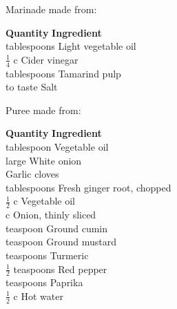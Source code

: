 Marinade made from:
\begin{tabbing}
\hspace{1.0cm}  \={\bf Quantity}   \hspace{3.0cm} \={\bf Ingredient}\\

        tablespoons \>Light vegetable oil\\
        \> $\frac{1}{4}$ c \>Cider vinegar\\
         tablespoons \>Tamarind pulp\\
        \> to taste      \> Salt\\
\end{tabbing}

Puree made from:
\begin{tabbing}
\hspace{1.0cm}  \={\bf Quantity}   \hspace{3.0cm} \={\bf Ingredient}\\

         tablespoon \>Vegetable oil\\
         large \>White onion\\
         \>Garlic cloves\\
         tablespoons \>Fresh ginger root, chopped\\
   \>$\frac{1}{2}$ c \>Vegetable oil\\
    c \>Onion, thinly sliced\\
    teaspoon \>Ground cumin\\
    teaspoon \>Ground mustard\\
    teaspoons \>Turmeric\\
    $\frac{1}{2}$ teaspoons \>Red pepper\\
    teaspoons \>Paprika\\
    $\frac{1}{2}$ c \>Hot water\\
\end{tabbing}

